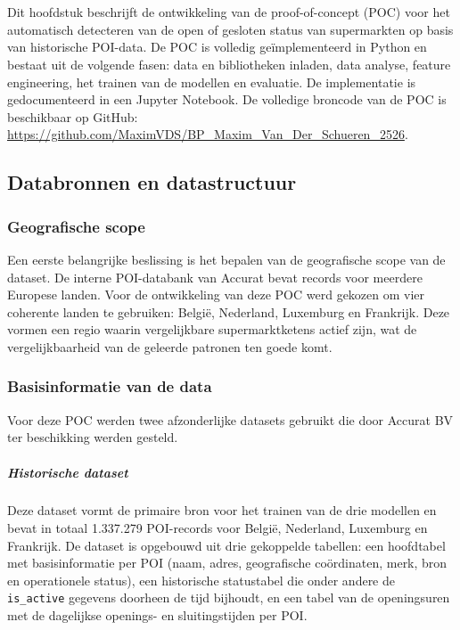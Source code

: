 \chapter{}%
\label{ch:proof-of-concept}

Dit hoofdstuk beschrijft de ontwikkeling van de proof-of-concept (POC) voor het automatisch detecteren van de open of gesloten status van supermarkten op basis van historische POI-data. De POC is volledig geïmplementeerd in Python en bestaat uit de volgende fasen: data en bibliotheken inladen, data analyse, feature engineering, het trainen van de modellen en evaluatie. De implementatie is gedocumenteerd in een Jupyter Notebook. De volledige broncode van de POC is beschikbaar op GitHub: \url{https://github.com/MaximVDS/BP_Maxim_Van_Der_Schueren_2526}.

\section{Databronnen en datastructuur}
\subsection{Geografische scope}
Een eerste belangrijke beslissing is het bepalen van de geografische scope van de dataset. De interne POI-databank van Accurat bevat records voor meerdere Europese landen. Voor de ontwikkeling van deze POC werd gekozen om vier coherente landen te gebruiken: België, Nederland, Luxemburg en Frankrijk. Deze vormen een regio waarin vergelijkbare supermarktketens actief zijn, wat de vergelijkbaarheid van de geleerde patronen ten goede komt. 

\subsection{Basisinformatie van de data}
Voor deze POC werden twee afzonderlijke datasets gebruikt die door Accurat BV ter beschikking werden gesteld.

\paragraph{Historische dataset}
Deze dataset vormt de primaire bron voor het trainen van de drie modellen en bevat in totaal 1.337.279 POI-records voor België, Nederland, Luxemburg en Frankrijk. De dataset is opgebouwd uit drie gekoppelde tabellen: een hoofdtabel met basisinformatie per POI (naam, adres, geografische coördinaten, merk, bron en operationele status), een historische statustabel die onder andere de \texttt{is\_active} gegevens doorheen de tijd bijhoudt, en een tabel van de openingsuren met de dagelijkse openings- en sluitingstijden per POI.

